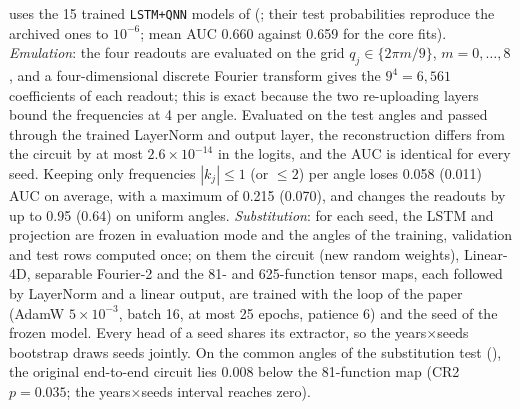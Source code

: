 \documentclass[11pt,a4paper]{article}
\begin{document}
 uses the 15 trained \texttt{LSTM+QNN} models of  (; their test probabilities reproduce the archived ones to $10^{-6}$; mean AUC 0.660 against 0.659 for the core fits). \emph{Emulation}: the four readouts are evaluated on the grid $q_j\in\{2\pi m/9\}$, $m=0,\dots,8$, and a four-dimensional discrete Fourier transform gives the $9^4=6{,}561$ coefficients of each readout; this is exact because the two re-uploading layers bound the frequencies at 4 per angle. Evaluated on the test angles and passed through the trained LayerNorm and output layer, the reconstruction differs from the circuit by at most $2.6\times10^{-14}$ in the logits, and the AUC is identical for every seed. Keeping only frequencies $|k_j|\le1$ (or $\le2$) per angle loses 0.058 (0.011) AUC on average, with a maximum of 0.215 (0.070), and changes the readouts by up to 0.95 (0.64) on uniform angles. \emph{Substitution}: for each seed, the LSTM and projection are frozen in evaluation mode and the angles of the training, validation and test rows computed once; on them the circuit (new random weights), Linear-4D, separable Fourier-2 and the 81- and 625-function tensor maps, each followed by LayerNorm and a linear output, are trained with the loop of the paper (AdamW $5\times10^{-3}$, batch 16, at most 25 epochs, patience 6) and the seed of the frozen model. Every head of a seed shares its extractor, so the years$\times$seeds bootstrap draws seeds jointly. On the common angles of the substitution test (), the original end-to-end circuit lies 0.008 below the 81-function map (CR2 $p=0.035$; the years$\times$seeds interval reaches zero).
\end{document}
